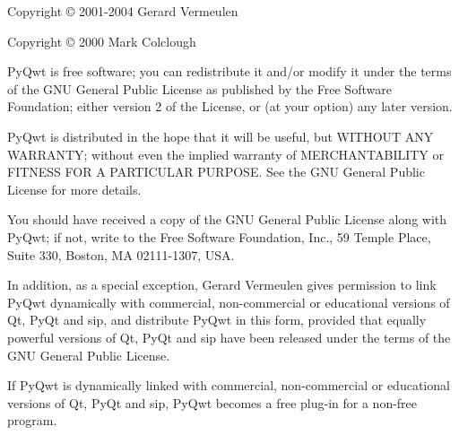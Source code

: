 Copyright \copyright{} 2001-2004 Gerard Vermeulen

Copyright \copyright{} 2000 Mark Colclough

PyQwt is free software; you can redistribute it and/or modify it under the
terms of the GNU General Public License as published by the Free Software
Foundation; either version 2 of the License, or (at your option) any later
version.

PyQwt is distributed in the hope that it will be useful, but WITHOUT ANY
WARRANTY; without even the implied warranty of MERCHANTABILITY or FITNESS
FOR A PARTICULAR PURPOSE.  See the GNU  General Public License for more
details.

You should have received a copy of the GNU General Public License along with
PyQwt; if not, write to the Free Software Foundation, Inc., 59 Temple Place,
Suite 330, Boston, MA 02111-1307, USA.

In addition, as a special exception, Gerard Vermeulen gives permission to
link PyQwt dynamically with commercial, non-commercial or educational 
versions of Qt, PyQt and sip, and distribute PyQwt in this form, provided
that equally powerful versions of Qt, PyQt and sip have been released under
the terms of the GNU General Public License.

If PyQwt is dynamically linked with commercial, non-commercial or
educational versions of Qt, PyQt and sip, PyQwt becomes a free plug-in
for a non-free program.
